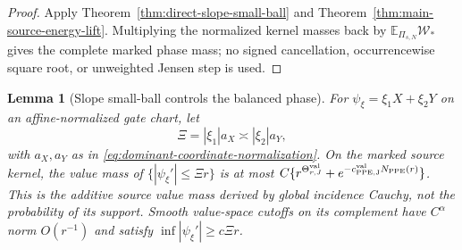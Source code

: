 \documentclass[11pt]{article}
\newtheorem{lemma}[theorem]{Lemma}
\begin{document}
\begin{proof}
Apply Theorem~\ref{thm:direct-slope-small-ball} and
Theorem~\ref{thm:main-source-energy-lift}.  Multiplying the normalized
kernel masses back by $\mathbb E_{\Pi_{s,N}}\mathscr W_*$ gives the complete
marked phase mass; no signed cancellation, occurrencewise square root, or
unweighted Jensen step is used.
\end{proof}

\begin{lemma}[Slope small-ball controls the balanced phase]
\label{lem:slope-good-bad-phase}
For $\psi_\xi=\xi_1X+\xi_2Y$ on an affine-normalized gate chart, let
\begin{equation}
\label{eq:balanced-physical-frequency}
 \Xi=|\xi_1|a_X\asymp|\xi_2|a_Y,
\end{equation}
with $a_X,a_Y$ as in \eqref{eq:dominant-coordinate-normalization}.  On the
marked source kernel, the value mass of
$\{|\psi_\xi'|\le\Xi r\}$ is at most
$C\{r^{\Theta_{r,J}^{\rm val}}
+e^{-c_{\rm PPE,J}^{\rm val}N_{\rm PPE}(r)}\}$.  This is the additive
source value mass derived by global incidence Cauchy, not the probability of
its support.  Smooth value-space cutoffs on its complement have
$C^\alpha$ norm $O(r^{-1})$ and satisfy
$\inf|\psi_\xi'|\ge c\Xi r$.
\end{lemma}
\end{document}
